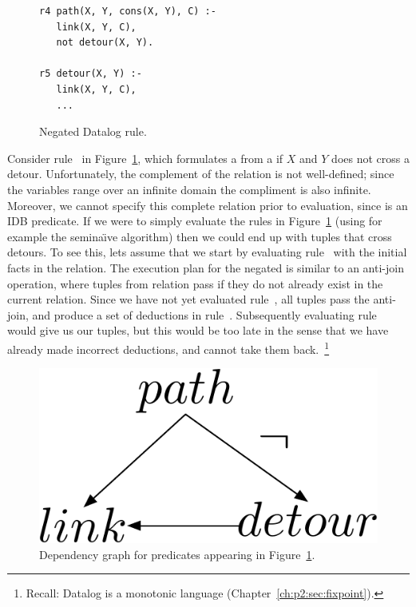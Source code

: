 \begin{figure}
\centering
\ssp
\begin{lstlisting}
r4 path(X, Y, cons(X, Y), C) :-
   link(X, Y, C),
   not detour(X, Y).

r5 detour(X, Y) :-
   link(X, Y, C),
   ... 
\end{lstlisting}
\caption{\label{ch:p2:fig:negation}Negated Datalog rule.}
\end{figure}

Consider rule~ in Figure~\ref{ch:p2:fig:negation}, which formulates a
 from a  if $X$ and $Y$ does not cross a detour.
Unfortunately, the complement of the  relation is not well-defined;
since the variables range over an infinite domain the compliment is also
infinite.  Moreover, we cannot specify this complete relation prior to
evaluation, since  is an IDB predicate.  If we were to simply
evaluate the rules in Figure~\ref{ch:p2:fig:negation} (using for example the
semina\"{\i}ve algorithm) then we could end up with  tuples that cross
detours.  To see this, lets assume that we start by evaluating rule~
with the initial facts in the  relation.  The execution plan for the
negated  is similar to an anti-join operation, where tuples from
 relation pass if they do not already exist in the current 
relation.  Since we have not yet evaluated rule~, all  tuples
pass the anti-join, and produce a set of  deductions in rule~.
Subsequently evaluating rule~ would give us our  tuples, but
this would be too late in the sense that we have already made incorrect
deductions, and cannot take them back.~\footnote{Recall: Datalog is a monotonic
language (Chapter~\ref{ch:p2:sec:fixpoint}).}

\begin{figure} 
\ssp
\begin{center}
\includegraphics[scale=0.75]{figures/dependency-graph}
\caption{\label{ch:p2:fig:dependency}Dependency graph for predicates 
appearing in Figure~\ref{ch:p2:fig:negation}.}
\end{center} 
\end{figure}

